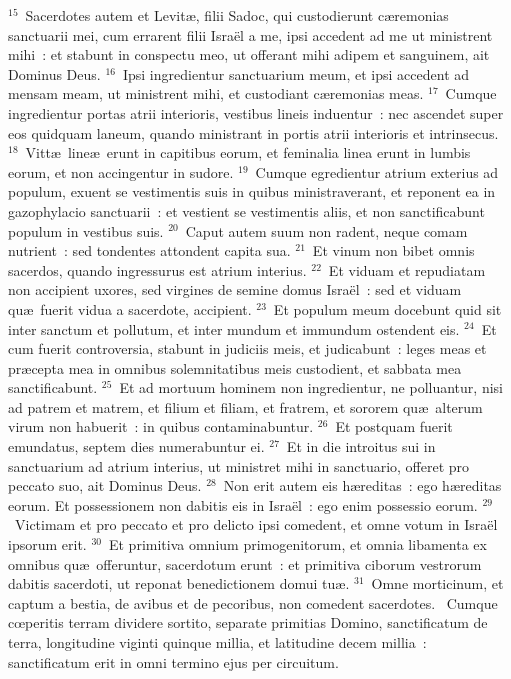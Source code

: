 ${}^{15}$~Sacerdotes autem et Levit\ae , filii Sadoc, qui custodierunt c\ae remonias sanctuarii mei, cum errarent filii Isra\"el a me, ipsi accedent ad me ut ministrent mihi~: et stabunt in conspectu meo, ut offerant mihi adipem et sanguinem, ait Dominus Deus.
${}^{16}$~Ipsi ingredientur sanctuarium meum, et ipsi accedent ad mensam meam, ut ministrent mihi, et custodiant c\ae remonias meas.
${}^{17}$~Cumque ingredientur portas atrii interioris, vestibus lineis induentur~: nec ascendet super eos quidquam laneum, quando ministrant in portis atrii interioris et intrinsecus.
${}^{18}$~Vitt\ae\ line\ae\ erunt in capitibus eorum, et feminalia linea erunt in lumbis eorum, et non accingentur in sudore.
${}^{19}$~Cumque egredientur atrium exterius ad populum, exuent se vestimentis suis in quibus ministraverant, et reponent ea in gazophylacio sanctuarii~: et vestient se vestimentis aliis, et non sanctificabunt populum in vestibus suis.
${}^{20}$~Caput autem suum non radent, neque comam nutrient~: sed tondentes attondent capita sua.
${}^{21}$~Et vinum non bibet omnis sacerdos, quando ingressurus est atrium interius.
${}^{22}$~Et viduam et repudiatam non accipient uxores, sed virgines de semine domus Isra\"el~: sed et viduam qu\ae\ fuerit vidua a sacerdote, accipient.
${}^{23}$~Et populum meum docebunt quid sit inter sanctum et pollutum, et inter mundum et immundum ostendent eis.
${}^{24}$~Et cum fuerit controversia, stabunt in judiciis meis, et judicabunt~: leges meas et pr\ae cepta mea in omnibus solemnitatibus meis custodient, et sabbata mea sanctificabunt.
${}^{25}$~Et ad mortuum hominem non ingredientur, ne polluantur, nisi ad patrem et matrem, et filium et filiam, et fratrem, et sororem qu\ae\ alterum virum non habuerit~: in quibus contaminabuntur.
${}^{26}$~Et postquam fuerit emundatus, septem dies numerabuntur ei.
${}^{27}$~Et in die introitus sui in sanctuarium ad atrium interius, ut ministret mihi in sanctuario, offeret pro peccato suo, ait Dominus Deus.
${}^{28}$~Non erit autem eis h\ae reditas~: ego h\ae reditas eorum. Et possessionem non dabitis eis in Isra\"el~: ego enim possessio eorum.
${}^{29}$~Victimam et pro peccato et pro delicto ipsi comedent, et omne votum in Isra\"el ipsorum erit.
${}^{30}$~Et primitiva omnium primogenitorum, et omnia libamenta ex omnibus qu\ae\ offeruntur, sacerdotum erunt~: et primitiva ciborum vestrorum dabitis sacerdoti, ut reponat benedictionem domui tu\ae .
${}^{31}$~Omne morticinum, et captum a bestia, de avibus et de pecoribus, non comedent sacerdotes.
~Cumque cœperitis terram dividere sortito, separate primitias Domino, sanctificatum de terra, longitudine viginti quinque millia, et latitudine decem millia~: sanctificatum erit in omni termino ejus per circuitum.
